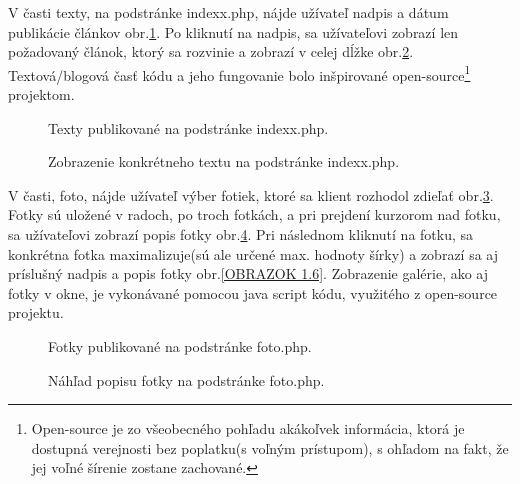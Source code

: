 


V časti texty, na podstránke indexx.php, nájde užívateľ nadpis a dátum publikácie článkov obr.\ref{OBRAZOK 1.2}. Po kliknutí na nadpis, sa užívateľovi zobrazí len požadovaný článok, ktorý sa rozvinie a zobrazí v celej dĺžke obr.\ref{OBRAZOK 1.3}. Textová/blogová časť kódu a jeho fungovanie bolo inšpirované open-source\footnote[2]{Open-source je zo všeobecného pohľadu akákoľvek informácia, ktorá je dostupná verejnosti bez poplatku(s voľným prístupom), s ohľadom na fakt, že jej voľné šírenie zostane zachované.} projektom\cite{blog}.

\begin{figure}[!tbh]
\centering
\setlength{\fboxsep}{0pt}%
\setlength{\fboxrule}{1pt}%
\caption{Texty publikované na podstránke indexx.php.}\label{OBRAZOK 1.2}
\end{figure}

\begin{figure}[!tbh]
\centering
\setlength{\fboxsep}{0pt}%
\setlength{\fboxrule}{1pt}%
\caption{Zobrazenie konkrétneho textu na podstránke indexx.php.}\label{OBRAZOK 1.3}
\end{figure}

\vspace{5cm}

V časti, foto, nájde užívateľ výber fotiek, ktoré sa klient rozhodol zdieľať obr.\ref{OBRAZOK 1.4}. Fotky sú uložené v radoch, po troch fotkách, a pri prejdení kurzorom nad fotku, sa užívateľovi zobrazí popis fotky obr.\ref{OBRAZOK 1.5}. Pri následnom kliknutí na fotku, sa konkrétna fotka maximalizuje(sú ale určené max. hodnoty šírky) a zobrazí sa aj príslušný nadpis a popis fotky obr.\ref{OBRAZOK 1.6}. Zobrazenie galérie, ako aj fotky v okne, je vykonávané pomocou java script kódu, využitého z open-source projektu\cite{Gallery}.

\begin{figure}[!tbh]
\centering
\setlength{\fboxsep}{0pt}%
\setlength{\fboxrule}{1pt}%
\caption{Fotky publikované na podstránke foto.php.}\label{OBRAZOK 1.4}
\end{figure}

\begin{figure}[!tbh]
\centering
\setlength{\fboxsep}{0pt}%
\setlength{\fboxrule}{1pt}%
\caption{Náhľad popisu fotky na podstránke foto.php.}\label{OBRAZOK 1.5}
\end{figure}

